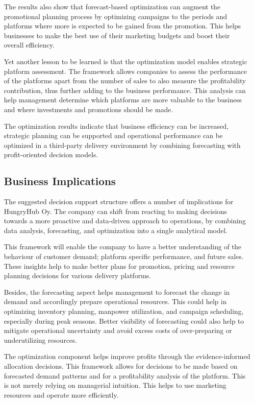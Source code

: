 The results also show that forecast-based optimization can augment the promotional planning process by optimizing campaigns to the periods and platforms where more is expected to be gained from the promotion. This helps businesses to make the best use of their marketing budgets and boost their overall efficiency.

Yet another lesson to be learned is that the optimization model enables strategic platform assessment. The framework allows companies to assess the performance of the platforms apart from the number of sales to also measure the profitability contribution, thus further adding to the business performance. This analysis can help management determine which platforms are more valuable to the business and where investments and promotions should be made.

The optimization results indicate that business efficiency can be increased, strategic planning can be supported and operational performance can be optimized in a third-party delivery environment by combining forecasting with profit-oriented decision models.


\subsection{Business Implications}

The suggested decision support structure offers a number of implications for HungryHub Oy. The company can shift from reacting to making decisions towards a more proactive and data-driven approach to operations, by combining data analysis, forecasting, and optimization into a single analytical model.

This framework will enable the company to have a better understanding of the behaviour of customer demand; platform specific performance, and future sales. These insights help to make better plans for promotion, pricing and resource planning decisions for various delivery platforms.

Besides, the forecasting aspect helps management to forecast the change in demand and accordingly prepare operational resources. This could help in optimizing inventory planning, manpower utilization, and campaign scheduling, especially during peak seasons. Better visibility of forecasting could also help to mitigate operational uncertainty and avoid excess costs of over-preparing or underutilizing resources.

The optimization component helps improve profits through the evidence-informed allocation decisions. This framework allows for decisions to be made based on forecasted demand patterns and for a profitability analysis of the platform. This is not merely relying on managerial intuition. This helps to use marketing resources and operate more efficiently.

